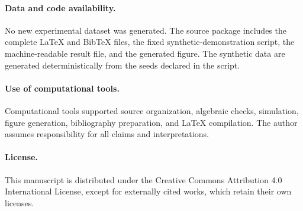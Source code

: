 \documentclass[11pt]{article}
\begin{document}
\paragraph{Data and code availability.}
No new experimental dataset was generated. The source package includes the complete LaTeX and BibTeX files, the fixed synthetic-demonstration script, the machine-readable result file, and the generated figure. The synthetic data are generated deterministically from the seeds declared in the script.

\paragraph{Use of computational tools.}
Computational tools supported source organization, algebraic checks, simulation, figure generation, bibliography preparation, and LaTeX compilation. The author assumes responsibility for all claims and interpretations.

\paragraph{License.}
This manuscript is distributed under the Creative Commons Attribution 4.0 International License, except for externally cited works, which retain their own licenses.



\end{document}
